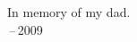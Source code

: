 \thispagestyle{empty}
{}

\vspace*{3cm}


\medskip

\begin{center}
    In memory of my dad. \\ \,--\,2009
\end{center}